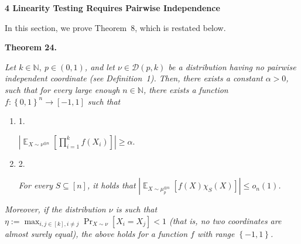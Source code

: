 \par\medskip\noindent\textbf{
4 Linearity Testing Requires Pairwise Independence}\par




In this section, we prove Theorem 8, which is restated below.\par





\par\medskip\noindent\textbf{
\textbf{Theorem 24}\textbf{.}
}\par



\emph{Let $k\in\mathbb{N},\ p\in(0,1)$, and let $\nu\in\mathcal{D}(p,k)$ be a distribution having no pairwise independent coordinate (see Definition 1).
Then, there exists a constant $\alpha>0$, such that for every large enough $n\in\mathbb{N}$, there exists a function $f:\left\{0,1\right\}^{n}\to[-1,1]$ such that}\par


\begin{enumerate}


\item[] 
1. 


$\left|\mathop{\mathbb{E}}_{X\sim\nu^{\otimes n}}\left[\prod_{i=1}^{k}f(X_{i})\right]\right|\geqslant\alpha.$\emph{}\par





\item[] 
2. 


\emph{For every }$S\subseteq[n]$\emph{, it holds that }$\left|\mathop{\mathbb{E}}_{X\sim\mu_{p}^{\otimes n}}\left[f(X)\chi_{S}(X)\right]\right|\leqslant o_{n}(1)$\emph{.}\par





\end{enumerate}




\emph{Moreover, if the distribution $\nu$ is such that $\eta:=\max_{i,j\in[k],i\not=j}\Pr_{X\sim\nu}\left[X_{i}=X_{j}\right]<1$ (that is, no two coordinates are almost surely equal), the above holds for a function $f$ with range $\left\{-1,1\right\}$.}\par






